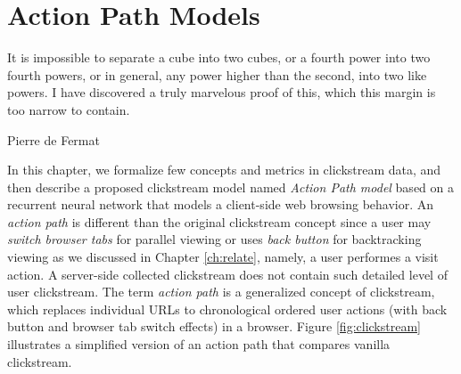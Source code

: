 \section{Action Path Models}
\label{ch:model}

\epigraph{It is impossible to separate a cube into two cubes, or a fourth power into 
two fourth powers, or in general, any power higher than the second, into two like powers. 
I have discovered a truly marvelous proof of this, which this margin is too narrow 
to contain.}{Pierre de Fermat}

In this chapter, we formalize few concepts and metrics in clickstream data,
and then describe a proposed clickstream model named \emph{Action Path model} 
based on a recurrent neural network that models a client-side web browsing behavior. 
An \emph{action path} is different than the original clickstream concept since 
a user may \emph{switch browser tabs} for parallel viewing \cite{huang2010parallel} 
or uses \emph{back button} 
for backtracking viewing \cite{huang2012no} as we discussed in Chapter \ref{ch:relate}, 
namely, a user performes a visit action.
A server-side collected clickstream does not contain such detailed level of user clickstream.
The term \emph{action path} is a generalized concept of clickstream, 
which replaces individual URLs to chronological ordered user actions 
(with back button and browser tab switch effects) in a browser.
Figure \ref{fig:clickstream} illustrates a simplified version of an action path 
that compares vanilla clickstream.

